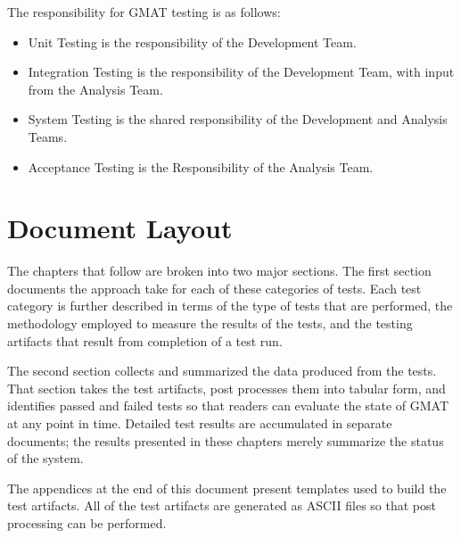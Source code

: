 The responsibility for GMAT testing is as follows:

\begin{itemize}
\item Unit Testing is the responsibility of the Development Team.
\item Integration Testing is the responsibility of the Development Team, with input from the
Analysis Team.
\item System Testing is the shared responsibility of the Development and Analysis Teams.
\item Acceptance Testing is the Responsibility of the Analysis Team.
\end{itemize}


\section{Document Layout}

The chapters that follow are broken into two major sections.  The first section documents the
approach take for each of these categories of tests.  Each test category is further described in
terms of the type of tests that are performed, the methodology employed to measure the results of
the tests, and the testing artifacts that result from completion of a test run.

The second section collects and summarized the data produced from the tests.  That section takes the test artifacts, post processes them into tabular form, and identifies passed and failed tests so that readers can evaluate the state of GMAT at any point in time.  Detailed test results are
accumulated in separate documents; the results presented in these chapters merely summarize the
status of the system.

The appendices at the end of this document present templates used to build the test artifacts.  All of the test artifacts are generated as ASCII files so that post processing can be performed.   
